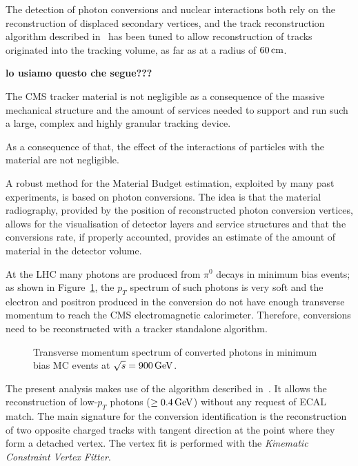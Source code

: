 \documentclass[a4paper]{jpconf}
\begin{document}
The detection of photon conversions and nuclear interactions both rely
on the reconstruction of displaced secondary vertices, and the track
reconstruction algorithm described in~\cite{TRK-10-001} has been tuned
to allow reconstruction of tracks originated into the tracking volume,
as far as at a radius of $60\rm \, cm$.




{\bf lo usiamo questo che segue???}

The CMS tracker material is not negligible as a consequence of the
massive mechanical structure and the amount of services needed to
support and run such a large, complex and highly granular tracking device.

As a consequence of that, the effect of the interactions of particles
with the material are not negligible. 


A robust method for the Material Budget estimation, exploited by many
past experiments, is based on photon conversions. The idea is that the
material radiography, provided by the position of reconstructed photon
conversion vertices, allows for the visualisation of detector layers
and service structures and that the conversions rate, if properly
accounted, provides an estimate of the amount of material in the
detector volume.

At the LHC many photons are produced from $\pi^0$ decays in minimum bias events; 
as shown in Figure~\ref{ptMC}, the $p_T$ spectrum of such photons is
very soft and the electron and positron produced in the conversion 
do not have enough transverse momentum to reach the CMS electromagnetic calorimeter.
Therefore, conversions need to be reconstructed with a tracker standalone algorithm.

\begin{figure}[!hbtp]
\centering
\caption{Transverse momentum spectrum of converted photons in minimum
  bias MC events at $\sqrt{s}=900{\rm \, GeV}$.}
\label{ptMC}
\end{figure}

The present analysis makes use of the algorithm described in~\cite{nancy}.
It allows the reconstruction of low-$p_T$ photons ($\geq 0.4{\rm \, GeV}$)
without any request of ECAL match. The main signature for the
conversion identification is the reconstruction of two opposite
charged tracks with tangent direction at the point where they form a
detached vertex. The vertex fit is performed with the \emph{Kinematic
  Constraint Vertex Fitter}.
\end{document}
